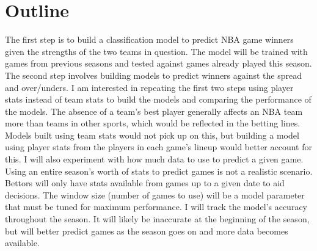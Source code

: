 \documentclass{article}
\begin{document}
\section{Outline}
The first step is to build a classification model to predict NBA game winners given the strengths of the two teams in question. The model will be trained with games from previous seasons and tested against games already played this season. The second step involves building models to predict winners against the spread and over/unders. I am interested in repeating the first two steps using player stats instead of team stats to build the models and comparing the performance of the models. The absence of a team's best player generally affects an NBA team more than teams in other sports, which would be reflected in the betting lines. Models built using team stats would not pick up on this, but building a model using player stats from the players in each game's lineup would better account for this. I will also experiment with how much data to use to predict a given game. Using an entire season's worth of stats to predict games is not a realistic scenario. Bettors will only have stats available from games up to a given date to aid decisions. The window size (number of games to use) will be a model parameter that must be tuned for maximum performance. I will track the model's accuracy throughout the season. It will likely be inaccurate at the beginning of the season, but will better predict games as the season goes on and more data becomes available.
\end{document}
